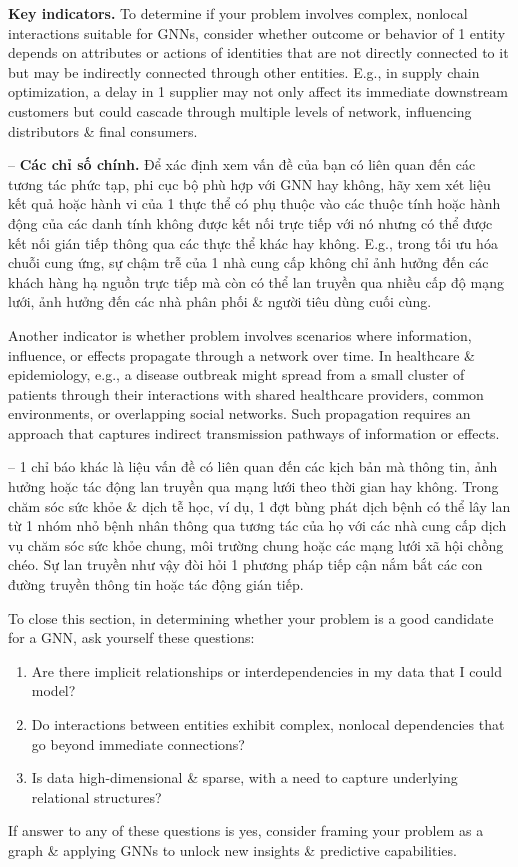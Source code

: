 \documentclass{article}
\begin{document}
\begin{itemize}
\begin{itemize}
\begin{itemize}
            {\bf Key indicators.} To determine if your problem involves complex, nonlocal interactions suitable for GNNs, consider whether outcome or behavior of 1 entity depends on attributes or actions of identities that are not directly connected to it but may be indirectly connected through other entities. E.g., in supply chain optimization, a delay in 1 supplier may not only affect its immediate downstream customers but could cascade through multiple levels of network, influencing distributors \& final consumers.

            -- {\bf Các chỉ số chính.} Để xác định xem vấn đề của bạn có liên quan đến các tương tác phức tạp, phi cục bộ phù hợp với GNN hay không, hãy xem xét liệu kết quả hoặc hành vi của 1 thực thể có phụ thuộc vào các thuộc tính hoặc hành động của các danh tính không được kết nối trực tiếp với nó nhưng có thể được kết nối gián tiếp thông qua các thực thể khác hay không. E.g., trong tối ưu hóa chuỗi cung ứng, sự chậm trễ của 1 nhà cung cấp không chỉ ảnh hưởng đến các khách hàng hạ nguồn trực tiếp mà còn có thể lan truyền qua nhiều cấp độ mạng lưới, ảnh hưởng đến các nhà phân phối \& người tiêu dùng cuối cùng.

            Another indicator is whether problem involves scenarios where information, influence, or effects propagate through a network over time. In healthcare \& epidemiology, e.g., a disease outbreak might spread from a small cluster of patients through their interactions with shared healthcare providers, common environments, or overlapping social networks. Such propagation requires an approach that captures indirect transmission pathways of information or effects.

            -- 1 chỉ báo khác là liệu vấn đề có liên quan đến các kịch bản mà thông tin, ảnh hưởng hoặc tác động lan truyền qua mạng lưới theo thời gian hay không. Trong chăm sóc sức khỏe \& dịch tễ học, ví dụ, 1 đợt bùng phát dịch bệnh có thể lây lan từ 1 nhóm nhỏ bệnh nhân thông qua tương tác của họ với các nhà cung cấp dịch vụ chăm sóc sức khỏe chung, môi trường chung hoặc các mạng lưới xã hội chồng chéo. Sự lan truyền như vậy đòi hỏi 1 phương pháp tiếp cận nắm bắt các con đường truyền thông tin hoặc tác động gián tiếp.

            To close this section, in determining whether your problem is a good candidate for a GNN, ask yourself these questions:
            \begin{enumerate}
                \item Are there implicit relationships or interdependencies in my data that I could model?
                \item Do interactions between entities exhibit complex, nonlocal dependencies that go beyond immediate connections?
                \item Is data high-dimensional \& sparse, with a need to capture underlying relational structures?
            \end{enumerate}
            If answer to any of these questions is yes, consider framing your problem as a graph \& applying GNNs to unlock new insights \& predictive capabilities.


\end{itemize}
\end{itemize}
\end{itemize}
\end{document}

